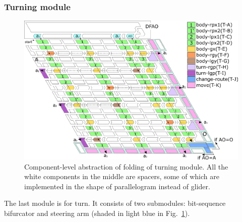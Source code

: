 			\subsubsection{Turning module}

\begin{figure}[t]
\centering
\includegraphics[width=\linewidth]{pic/overall_turn_part.pdf}
\caption{
Component-level abstraction of folding of turning module.
All the white components in the middle are spacers, some of which are implemented in the shape of parallelogram instead of glider. 
 }
\label{fig:overall_turning}
\end{figure}

The last module is for turn. 
It consists of two submodules: bit-sequence bifurcator and steering arm (shaded in light blue in Fig.~\ref{fig:overall_turning}). 

